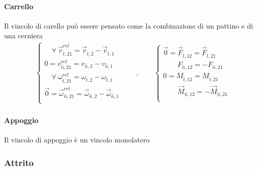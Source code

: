 \documentclass[letterpaper,10pt,italian]{jupyterBook}
\begin{document}
\paragraph{Carrello}
\label{\detokenize{ch/mechanics/actions-examples:carrello}}
\sphinxAtStartPar
Il vincolo di carello può essere pensato come la combinazione di un pattino e di una cerniera
\begin{equation*}
\begin{split}
\begin{cases}
  \quad \forall \ \vec{v}^{rel}_{\hat{t},21}     = \vec{v}_{\hat{t},2}     - \vec{v}_{\hat{t},1} \\
          0  = v^{rel}_{\hat{n},21}     = v_{\hat{n},2}     - v_{\hat{n},1} \\
  \quad \forall \ \omega^{rel}_{\hat{t},21} = \omega_{\hat{t},2} - \omega_{\hat{t},1} \\
  \vec{0} = \vec{\omega}^{rel}_{\hat{n},21} = \vec{\omega}_{\hat{n},2} - \vec{\omega}_{\hat{n},1} \\
\end{cases}
\qquad , \qquad
\begin{cases}
  \vec{0} = \vec{F}_{\hat{t},12} = \vec{F}_{\hat{t},21} \\
  \qquad F_{\hat{n},12} = - F_{\hat{n},21} \\
  0 =  M_{\hat{t},12} = M_{\hat{t},21} \\
  \qquad \vec{M}_{\hat{n},12} = - \vec{M}_{\hat{n},21} \\
\end{cases}
\end{split}
\end{equation*}

\paragraph{Appoggio}
\label{\detokenize{ch/mechanics/actions-examples:appoggio}}
\sphinxAtStartPar
Il vincolo di appoggio è un vincolo monolatero  


\subsubsection{Attrito}
\label{\detokenize{ch/mechanics/actions-examples:attrito}}
\end{document}
